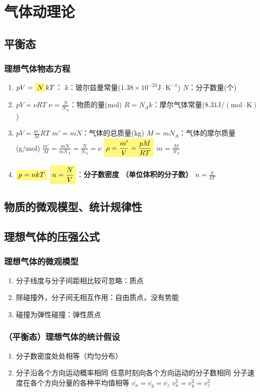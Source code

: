 \documentclass[UTF8,a4paper,12pt,scheme=chinese]{ctexart}
\newcommand{\hla}[1]{%
	\colorbox{yellow!50}{$\displaystyle#1$}}
\begin{document}
	\section{气体动理论}
	\subsection{平衡态}
	\subsubsection{理想气体物态方程}
	\begin{enumerate}
		\item $pV=\hla{N}kT$：
		\subitem $k$：玻尔兹曼常量($\mathrm{1.38\times10^{-23}J\cdot K^{-1}}$)
		\subitem $N$：分子数量(个)
		\item $pV=\nu RT$
		\subitem $\nu = \frac{N}{N_A}$：物质的量(mol)
		\subitem $R=N_Ak$：摩尔气体常量($\mathrm{8.31\mathrm{J}/(mol\cdot K)}$)
		\item $pV=\frac{m'}{M}RT$
		\subitem $m'=mN$：气体的总质量(kg)
		\subitem $M=mN_A$：气体的摩尔质量(g/mol)
		\subitem $\frac{m'}{M}=\frac{mN}{mN_A}=\frac{N}{N_A}=\nu$
		\subitem $\hla{\rho=\frac{m'}{V}=\frac{pM}{RT}}$
		\subitem $m=\frac{M}{N_A}$
		\item $\hla{p=nkT}$
		\subitem $\hla{n=\frac{N}{V}}$：\bfseries{分子数密度} （单位体积的分子数）
		\subitem $n=\frac{p}{kT}$
	\end{enumerate}
	\subsection{物质的微观模型、统计规律性}
	\subsection{理想气体的压强公式}
	\subsubsection{理想气体的微观模型}
	\begin{enumerate}
		\item 分子线度与分子间距相比较可忽略：质点
		\item 除碰撞外，分子间无相互作用：自由质点，没有势能
		\item 碰撞为弹性碰撞：弹性质点
	\end{enumerate}
	\subsubsection{（平衡态）理想气体的统计假设}
	\begin{enumerate}
		\item 分子数密度处处相等（均匀分布）
		\item 分子沿各个方向运动概率相同
		\subitem 任意时刻向各个方向运动的分子数相同
		\subitem 分子速度在各个方向分量的各种平均值相等
		\subsubitem $\overline{v_x}=\overline{v_y}=\overline{v_z}$
		\subsubitem $\overline{v^2_x}=\overline{v^2_y}=\overline{v^2_z}$
	\end{enumerate}
\end{document}
